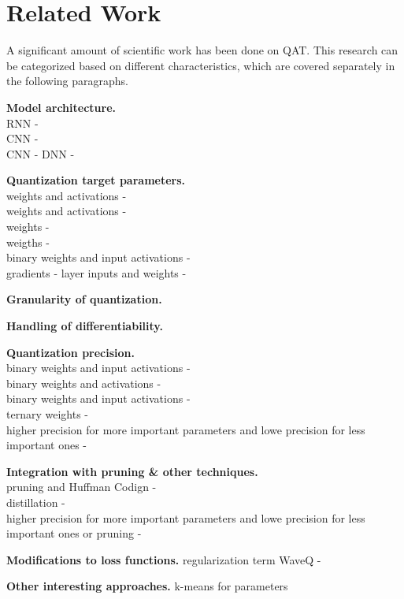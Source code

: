 \chapter{Related Work\label{cha:chapter5}}

A significant amount of scientific work has been done on QAT. 
This research can be categorized based on different characteristics, 
which are covered separately in the following paragraphs.

\noindent
\textbf{Model architecture.}\\
RNN - \cite{ott2016rnn}\\
CNN - \cite{rastegari2016xnor}\\
CNN - \cite{courbariaux2015binaryconnect}
DNN - \cite{yunchao2014compressing}

\noindent
\textbf{Quantization target parameters.}\\
weights and activations - \cite{krishnamoorthi2018quantizing}\\
weights and activations - \cite{hubara2016qnn}\\
weights - \cite{polino2018modelcompression}\\
weigths - \cite{ott2016rnn}\\
binary weights and input activations - \cite{rastegari2016xnor}\\
gradients - \cite{shuchang2016dorafenet}
layer inputs and weights - \cite{Edouard2022SPIQ} 

\noindent
\textbf{Granularity of quantization.}

\noindent
\textbf{Handling of differentiability.}

\noindent
\textbf{Quantization precision.}\\
binary weights and input activations - \cite{courbariaux2015binaryconnect}\\
binary weights and activations - \cite{hubara2016qnn}\\
binary weights and input activations - \cite{rastegari2016xnor}\\
ternary weights - \cite{ott2016rnn}\\
higher precision for more important parameters and lowe precision for less important ones - \cite{soroosh2018adaptive}

\noindent
\textbf{Integration with pruning \& other techniques.}\\
pruning and Huffman Codign - \cite{han2016deepcompression}\\
distillation - \cite{polino2018modelcompression}\\
higher precision for more important parameters and lowe precision for less important ones or pruning - \cite{soroosh2018adaptive}

\noindent
\textbf{Modifications to loss functions.}
regularization term WaveQ - \cite{DBLP:journals/corr/abs-2003-00146}

\noindent
\textbf{Other interesting approaches.}
k-means for parameters \cite{yunchao2014compressing}
